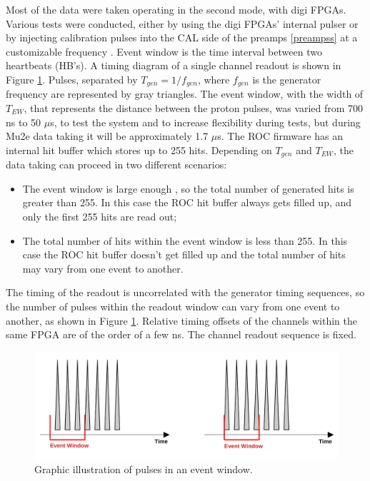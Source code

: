     Most of the data were taken operating in the second mode, with digi FPGAs.
    Various tests were conducted, either by using the digi FPGAs' internal pulser 
    or by injecting calibration pulses into the CAL side of the preamps \ref{preampss} at a customizable frequency . 
    Event window is the time interval between two heartbeats (HB's). 
    A timing diagram of a single channel readout is shown in Figure \ref{fig:3}.
    Pulses, separated by $T_{gen}=1/f_{gen}$, where $f_{gen}$ is the generator frequency
    are represented by gray triangles.
    The event window, with the width of $T_{EW}$, that represents the distance between the proton pulses, 
    was varied from 700 ns to 50 $\mu$s, to test the system and to increase flexibility during tests, but during Mu2e data taking it will be approximately 1.7 $\mu$s. 
    The ROC firmware has an internal hit buffer which stores up to 255 hits.
    Depending on $T_{gen}$ and $T_{EW}$, the data taking can proceed in two different
    scenarios:
    \begin{itemize}
    \item
      The event window is large enough , so the total number of generated hits is greater than 255. In this case
      the ROC hit buffer always gets filled up, and only the first 255 hits are read out;
    \item
      The total number of hits within the event window is less than 255.
      In this case the ROC hit buffer doesn't get filled up and the total number of hits may vary from one event to another.
    \end{itemize}
    The timing of the readout is uncorrelated with the generator timing sequences, 
    so the number of pulses within the readout window can vary from one event to another, as shown 
    in Figure \ref{fig:3}. Relative timing offsets of the channels within the same FPGA are of the order of a few ns. The channel readout sequence is fixed.
    \begin{figure}[!h]
    \centering
    \includegraphics[width =1\textwidth]{figures/png/finalimg.png}
    \caption{Graphic illustration of pulses in an event window.}
    \label{fig:3}
    \end{figure}
